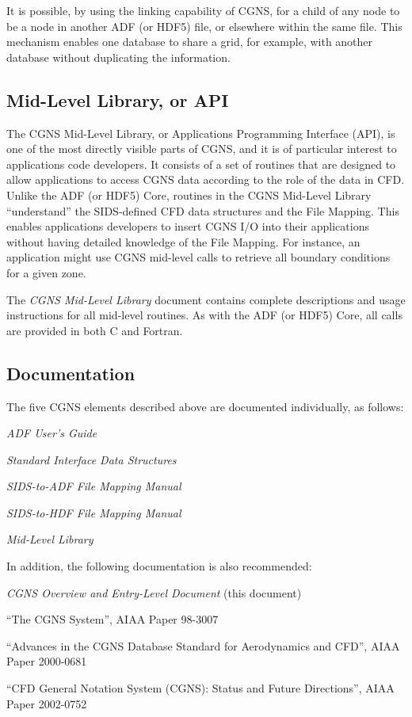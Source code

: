 It is possible, by using the linking capability of CGNS, for a child of
any node to be a node in another ADF (or HDF5) file, or elsewhere within
the same file.
This mechanism enables one database to share a grid, for example, with
another database without duplicating the information.

\subsection{Mid-Level Library, or API}

The CGNS Mid-Level Library, or Applications Programming Interface
(API), is one of the most directly visible parts of CGNS, and it is of
particular interest to applications code developers.
It consists of a set of routines that are designed to allow applications
to access CGNS data according to the role of the data in CFD.
Unlike the ADF (or HDF5) Core, routines in the CGNS Mid-Level Library
``understand'' the SIDS-defined CFD data structures and the File
Mapping.
This enables applications developers to insert CGNS I/O into their
applications without having detailed knowledge of the File Mapping.
For instance, an application might use CGNS mid-level calls to retrieve
all boundary conditions for a given zone.

The \textit{CGNS Mid-Level Library} document contains complete
descriptions and usage instructions for all mid-level routines.
As with the ADF (or HDF5) Core, all calls are provided in both C and
Fortran.

\subsection{Documentation}

The five CGNS elements described above are documented individually,
as follows:

\begin{itemize*}
\item \textit{ADF User's Guide}
\item \textit{Standard Interface Data Structures}
\item \textit{SIDS-to-ADF File Mapping Manual}
\item \textit{SIDS-to-HDF File Mapping Manual}
\item \textit{Mid-Level Library}
\end{itemize*}

\noindent
In addition, the following documentation is also recommended:

\begin{itemize*}
\item \textit{CGNS Overview and Entry-Level Document} (this document)
\item ``The CGNS System'', AIAA Paper 98-3007
\item ``Advances in the CGNS Database Standard for Aerodynamics and
      CFD'', AIAA Paper 2000-0681
\item ``CFD General Notation System (CGNS): Status and Future
      Directions'', AIAA Paper 2002-0752
\end{itemize*}

